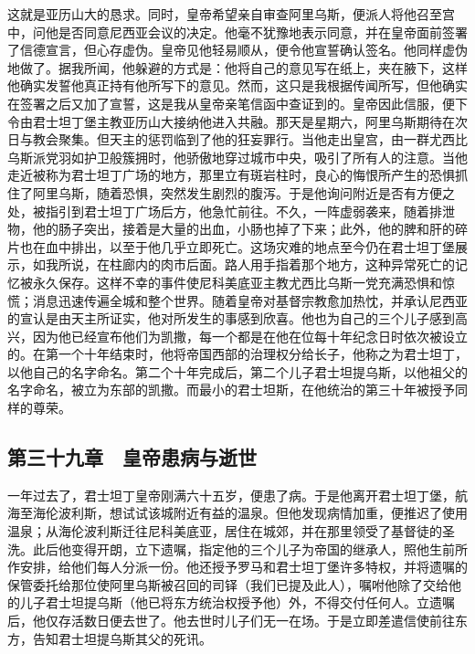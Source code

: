 这就是亚历山大的恳求。同时，皇帝希望亲自审查阿里乌斯，便派人将他召至宫中，问他是否同意尼西亚会议的决定。他毫不犹豫地表示同意，并在皇帝面前签署了信德宣言，但心存虚伪。皇帝见他轻易顺从，便令他宣誓确认签名。他同样虚伪地做了。据我所闻，他躲避的方式是：他将自己的意见写在纸上，夹在腋下，这样他确实发誓他真正持有他所写下的意见。然而，这只是我根据传闻所写，但他确实在签署之后又加了宣誓，这是我从皇帝亲笔信函中查证到的。皇帝因此信服，便下令由君士坦丁堡主教亚历山大接纳他进入共融。那天是星期六，阿里乌斯期待在次日与教会聚集。但天主的惩罚临到了他的狂妄罪行。当他走出皇宫，由一群尤西比乌斯派党羽如护卫般簇拥时，他骄傲地穿过城市中央，吸引了所有人的注意。当他走近被称为君士坦丁广场的地方，那里立有斑岩柱时，良心的悔恨所产生的恐惧抓住了阿里乌斯，随着恐惧，突然发生剧烈的腹泻。于是他询问附近是否有方便之处，被指引到君士坦丁广场后方，他急忙前往。不久，一阵虚弱袭来，随着排泄物，他的肠子突出，接着是大量的出血，小肠也掉了下来；此外，他的脾和肝的碎片也在血中排出，以至于他几乎立即死亡。这场灾难的地点至今仍在君士坦丁堡展示，如我所说，在柱廊内的肉市后面。路人用手指着那个地方，这种异常死亡的记忆被永久保存。这样不幸的事件使尼科美底亚主教尤西比乌斯一党充满恐惧和惊慌；消息迅速传遍全城和整个世界。随着皇帝对基督宗教愈加热忱，并承认尼西亚的宣认是由天主所证实，他对所发生的事感到欣喜。他也为自己的三个儿子感到高兴，因为他已经宣布他们为凯撒，每一个都是在他在位每十年纪念日时依次被设立的。在第一个十年结束时，他将帝国西部的治理权分给长子，他称之为君士坦丁，以他自己的名字命名。第二个十年完成后，第二个儿子君士坦提乌斯，以他祖父的名字命名，被立为东部的凯撒。而最小的君士坦斯，在他统治的第三十年被授予同样的尊荣。\par


\subsection{第三十九章　皇帝患病与逝世}

一年过去了，君士坦丁皇帝刚满六十五岁，便患了病。于是他离开君士坦丁堡，航海至海伦波利斯，想试试该城附近有益的温泉。但他发现病情加重，便推迟了使用温泉；从海伦波利斯迁往尼科美底亚，居住在城郊，并在那里领受了基督徒的圣洗。此后他变得开朗，立下遗嘱，指定他的三个儿子为帝国的继承人，照他生前所作安排，给他们每人分派一份。他还授予罗马和君士坦丁堡许多特权，并将遗嘱的保管委托给那位使阿里乌斯被召回的司铎（我们已提及此人），嘱咐他除了交给他的儿子君士坦提乌斯（他已将东方统治权授予他）外，不得交付任何人。立遗嘱后，他仅存活数日便去世了。他去世时儿子们无一在场。于是立即差遣信使前往东方，告知君士坦提乌斯其父的死讯。\par

